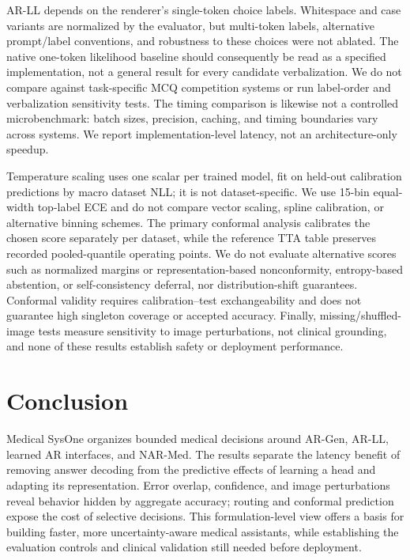 AR-LL depends on the renderer's single-token choice labels. Whitespace and case variants are normalized by the evaluator, but multi-token labels, alternative prompt/label conventions, and robustness to these choices were not ablated. The native one-token likelihood baseline should consequently be read as a specified implementation, not a general result for every candidate verbalization. We do not compare against task-specific MCQ competition systems or run label-order and verbalization sensitivity tests. The timing comparison is likewise not a controlled microbenchmark: batch sizes, precision, caching, and timing boundaries vary across systems. We report implementation-level latency, not an architecture-only speedup.

Temperature scaling uses one scalar per trained model, fit on held-out calibration predictions by macro dataset NLL; it is not dataset-specific. We use 15-bin equal-width top-label ECE and do not compare vector scaling, spline calibration, or alternative binning schemes. The primary conformal analysis calibrates the chosen score separately per dataset, while the reference TTA table preserves recorded pooled-quantile operating points. We do not evaluate alternative scores such as normalized margins or representation-based nonconformity, entropy-based abstention, or self-consistency deferral, nor distribution-shift guarantees. Conformal validity requires calibration--test exchangeability and does not guarantee high singleton coverage or accepted accuracy. Finally, missing/shuffled-image tests measure sensitivity to image perturbations, not clinical grounding, and none of these results establish safety or deployment performance.

\section{Conclusion}
\label{sec:conclusion}
Medical SysOne organizes bounded medical decisions around AR-Gen, AR-LL, learned AR interfaces, and NAR-Med. The results separate the latency benefit of removing answer decoding from the predictive effects of learning a head and adapting its representation. Error overlap, confidence, and image perturbations reveal behavior hidden by aggregate accuracy; routing and conformal prediction expose the cost of selective decisions. This formulation-level view offers a basis for building faster, more uncertainty-aware medical assistants, while establishing the evaluation controls and clinical validation still needed before deployment.
